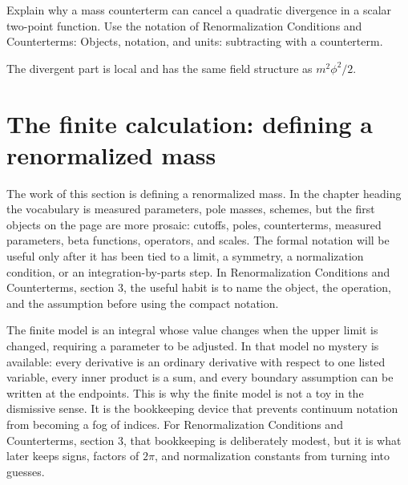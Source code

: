 \begin{exercise}
Explain why a mass counterterm can cancel a quadratic divergence in a scalar two-point function.  Use the notation of Renormalization Conditions and Counterterms: Objects, notation, and units: subtracting with a counterterm.
\begin{answer}
The divergent part is local and has the same field structure as \(m^2\phi^2/2\).
\end{answer}
\end{exercise}



\section{The finite calculation: defining a renormalized mass}













The work of this section is defining a renormalized mass.  In the chapter heading the vocabulary is measured parameters, pole masses, schemes, but the first objects on the page are more prosaic: cutoffs, poles, counterterms, measured parameters, beta functions, operators, and scales.  The formal notation will be useful only after it has been tied to a limit, a symmetry, a normalization condition, or an integration-by-parts step.  In Renormalization Conditions and Counterterms, section 3, the useful habit is to name the object, the operation, and the assumption before using the compact notation.

The finite model is an integral whose value changes when the upper limit is changed, requiring a parameter to be adjusted.  In that model no mystery is available: every derivative is an ordinary derivative with respect to one listed variable, every inner product is a sum, and every boundary assumption can be written at the endpoints.  This is why the finite model is not a toy in the dismissive sense.  It is the bookkeeping device that prevents continuum notation from becoming a fog of indices.  For Renormalization Conditions and Counterterms, section 3, that bookkeeping is deliberately modest, but it is what later keeps signs, factors of \(2\pi\), and normalization constants from turning into guesses.

